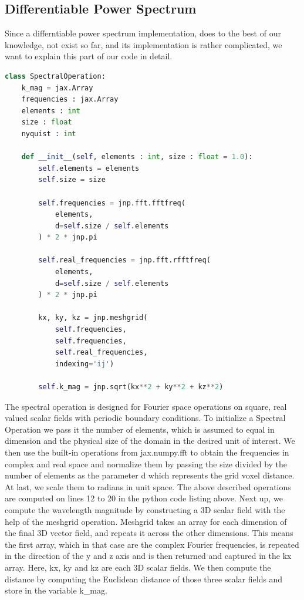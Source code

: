 \documentclass{article}
\begin{document}
\subsection{Differentiable Power Spectrum}

Since a differntiable power spectrum implementation, does to the best of our knowledge, not exist so far, and its implementation is rather complicated, we want to explain this part of our code in detail.

\begin{lstlisting}[language=Python]
class SpectralOperation:
    k_mag = jax.Array
    frequencies : jax.Array
    elements : int
    size : float
    nyquist : int

    def __init__(self, elements : int, size : float = 1.0):
        self.elements = elements
        self.size = size

        self.frequencies = jnp.fft.fftfreq(
            elements, 
            d=self.size / self.elements
        ) * 2 * jnp.pi
            
        self.real_frequencies = jnp.fft.rfftfreq(
            elements,
            d=self.size / self.elements
        ) * 2 * jnp.pi

        kx, ky, kz = jnp.meshgrid(
            self.frequencies, 
            self.frequencies, 
            self.real_frequencies, 
            indexing='ij')
            
        self.k_mag = jnp.sqrt(kx**2 + ky**2 + kz**2)
\end{lstlisting}

The spectral operation is designed for Fourier space operations on square, real valued scalar fields with periodic boundary conditions. To initialize a {Spectral Operation} we pass it the number of elements, which is assumed to equal in dimension and the physical size of the domain in the desired unit of interest. We then use the built-in operations from {jax.numpy.fft} to obtain the frequencies in complex and real space and normalize them by passing the size divided by the number of elements as the parameter {d} which represents the grid voxel distance. At last, we scale them to radians in unit space. The above described operations are computed on lines 12 to 20 in the python code listing above. Next up, we compute the wavelength magnitude by constructing a 3D scalar field with the help of the meshgrid operation. Meshgrid takes an array for each dimension of the final 3D vector field, and repeats it across the other dimensions. This means the first array, which in that case are the complex Fourier frequencies, is repeated in the direction of the y and z axis and is then returned and captured in the {kx} array. Here, kx, ky and kz are each 3D scalar fields. We then compute the distance by computing the Euclidean distance of those three scalar fields and store in the variable {k\_mag}.
\end{document}
